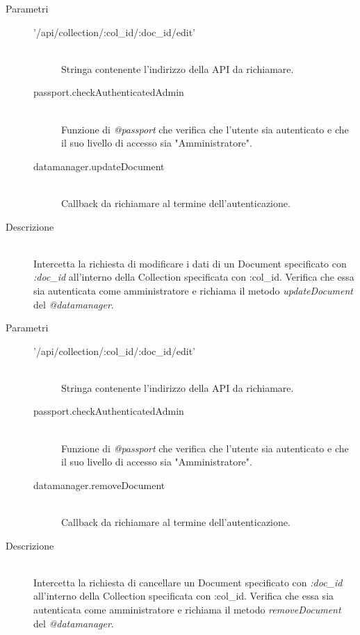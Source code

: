\begin{description}
\begin{description}
\begin{mldescription}
   \hfill 
  \begin{description}
   \item[Parametri] \hfill 
    \begin{description}
     \item['/api/collection/:col\_id/:doc\_id/edit'] \hfill \\
     Stringa contenente l'indirizzo della API da richiamare.
     \item[passport.checkAuthenticatedAdmin] \hfill \\
     Funzione di \textit{@passport} che verifica che l'utente sia autenticato e che il suo livello di accesso sia "Amministratore".
     \item[datamanager.updateDocument] \hfill \\
     Callback da richiamare al termine dell'autenticazione.
     \end{description}
   \item[Descrizione] \hfill \\ 
  Intercetta la richiesta di modificare i dati di un Document specificato con \textit{:doc\_id} all'interno della Collection specificata con :col\_id. Verifica che essa sia autenticata come amministratore e richiama il metodo \textit{updateDocument} del \textit{@datamanager}.
  \end{description}
  
   \hfill 
  \begin{description}
   \item[Parametri] \hfill 
    \begin{description}
     \item['/api/collection/:col\_id/:doc\_id/edit'] \hfill \\
     Stringa contenente l'indirizzo della API da richiamare.
     \item[passport.checkAuthenticatedAdmin] \hfill \\
     Funzione di \textit{@passport} che verifica che l'utente sia autenticato e che il suo livello di accesso sia "Amministratore".
     \item[datamanager.removeDocument] \hfill \\
     Callback da richiamare al termine dell'autenticazione.
     \end{description}
   \item[Descrizione] \hfill \\ 
  Intercetta la richiesta di cancellare un Document specificato con \textit{:doc\_id} all'interno della Collection specificata con :col\_id. Verifica che essa sia autenticata come amministratore e richiama il metodo \textit{removeDocument} del \textit{@datamanager}.
  \end{description}
 

\end{mldescription}
\end{description}
\end{description}
